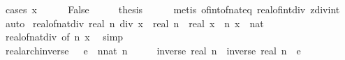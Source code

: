 \begin{isabellebody}
\ {\isacharparenleft}{\kern0pt}cases\ {\isachardoublequoteopen}x\ {\isacharequal}{\kern0pt}\ {}{\isachardoublequoteclose}{\isacharparenright}{\kern0pt}\isanewline
\ \ \isamarkupfalse%
\ False\isanewline
\ \ \isamarkupfalse%
\ \isamarkupfalse%
\ {\isacharquery}{\kern0pt}thesis\isanewline
\ \ \ \ \isamarkupfalse%
\ {\isacharparenleft}{\kern0pt}metis\ of{\isacharunderscore}{\kern0pt}int{\isacharunderscore}{\kern0pt}of{\isacharunderscore}{\kern0pt}nat{\isacharunderscore}{\kern0pt}eq\ real{\isacharunderscore}{\kern0pt}of{\isacharunderscore}{\kern0pt}int{\isacharunderscore}{\kern0pt}div{}\ zdiv{\isacharunderscore}{\kern0pt}int{\isacharparenright}{\kern0pt}\isanewline
{}\isamarkupfalse%
\ auto%
\endisatagproof
{\isafoldproof}%
%
\isadelimproof
\isanewline
%
\endisadelimproof
\isanewline
{}\isamarkupfalse%
\ real{\isacharunderscore}{\kern0pt}of{\isacharunderscore}{\kern0pt}nat{\isacharunderscore}{\kern0pt}div{}{\isacharcolon}{\kern0pt}\ {\isachardoublequoteopen}real\ {\isacharparenleft}{\kern0pt}n\ div\ x{\isacharparenright}{\kern0pt}\ {\isasymle}\ real\ n\ {\isacharslash}{\kern0pt}\ real\ x{\isachardoublequoteclose}\ \ n\ x\ {\isacharcolon}{\kern0pt}{\isacharcolon}{\kern0pt}\ nat\isanewline
%
\isadelimproof
\ \ %
\endisadelimproof
%
\isatagproof
{}\isamarkupfalse%
\ real{\isacharunderscore}{\kern0pt}of{\isacharunderscore}{\kern0pt}nat{\isacharunderscore}{\kern0pt}div{}\ {\isacharbrackleft}{\kern0pt}of\ n\ x{\isacharbrackright}{\kern0pt}\ \isamarkupfalse%
\ simp%
\endisatagproof
{\isafoldproof}%
%
\isadelimproof
%
\endisadelimproof
%
\isadelimdocument
%
\endisadelimdocument
%
\isatagdocument
%
\isamarkuptrue%
%
\endisatagdocument
{\isafolddocument}%
%
\isadelimdocument
%
\endisadelimdocument
{}\isamarkupfalse%
\ real{\isacharunderscore}{\kern0pt}arch{\isacharunderscore}{\kern0pt}inverse{\isacharcolon}{\kern0pt}\ {\isachardoublequoteopen}{}\ {\isacharless}{\kern0pt}\ e\ {\isasymlongleftrightarrow}\ {\isacharparenleft}{\kern0pt}{\isasymexists}n{\isacharcolon}{\kern0pt}{\isacharcolon}{\kern0pt}nat{\isachardot}{\kern0pt}\ n\ {\isasymnoteq}\ {}\ {\isasymand}\ {}\ {\isacharless}{\kern0pt}\ inverse\ {\isacharparenleft}{\kern0pt}real\ n{\isacharparenright}{\kern0pt}\ {\isasymand}\ inverse\ {\isacharparenleft}{\kern0pt}real\ n{\isacharparenright}{\kern0pt}\ {\isacharless}{\kern0pt}\ e{\isacharparenright}{\kern0pt}{\isachardoublequoteclose}\isanewline

\end{isabellebody}
